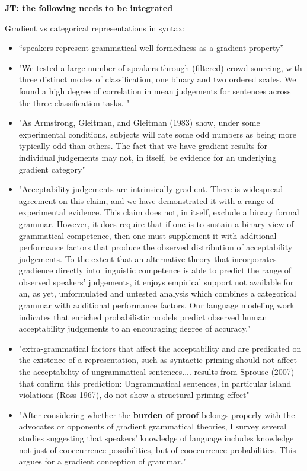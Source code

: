 \documentclass[11pt,fleqn]{article}
\newcommand{\6}{\mbox{$[\hspace*{-.6mm}[$}}
\newcommand{\9}{\mbox{$]\hspace*{-.6mm}]$}}
\newcommand{\jt}[1]{\textbf{\color{blue}JT: #1}}
\begin{document}
\jt{the following needs to be integrated}

Gradient vs categorical representations in syntax:
\begin{itemize}
	\item ``speakers represent grammatical well-formedness as a gradient property'' \cite{lau2014}
	\item "We tested a large number of speakers through (filtered) crowd sourcing, with three distinct modes of classification, one binary and
two ordered scales. We found a high degree of correlation in mean judgements for sentences across the three classification tasks. " \cite{lau2014}
	\item "As Armstrong, Gleitman, and Gleitman (1983)
show, under some experimental conditions, subjects will rate some odd numbers as being more typically odd than others.
The fact that we have gradient results for individual judgements may not, in itself, be evidence for an underlying gradient category" \cite{lau2014}
	\item "Acceptability judgements are intrinsically gradient. There is widespread agreement on this claim, and we have demonstrated it with a range of experimental evidence. This claim does not, in itself, exclude a binary formal grammar. However, it does require that if one is to sustain a binary view of grammatical competence, then one must supplement it with additional performance factors that produce the observed distribution of acceptability judgements. To the extent that an alternative theory that incorporates gradience directly into linguistic competence is able to predict the range of observed speakers' judgements, it enjoys empirical support not available for an, as yet, unformulated and untested analysis which combines a categorical grammar with additional performance factors. Our language modeling work indicates that enriched probabilistic models predict observed human acceptability judgements to an encouraging degree of accuracy." \cite{lau2017}
	\item "extra-grammatical factors that
affect the acceptability and are predicated on the existence of a representation, such as syntactic priming should not affect the acceptability of ungrammatical sentences.... results from Sprouse (2007) that confirm this prediction: Ungrammatical sentences, in particular island
violations (Ross 1967), do not show a structural priming effect" \cite{sprouse2007}
	\item "After considering whether the \textbf{burden of proof} belongs properly with the advocates or opponents of gradient grammatical theories, I survey several studies suggesting that speakers' knowledge of language includes knowledge not just of cooccurrence possibilities, but of cooccurrence probabilities. This argues for a gradient conception of grammar." \cite{wasow2007}

\end{itemize}
\end{document}

